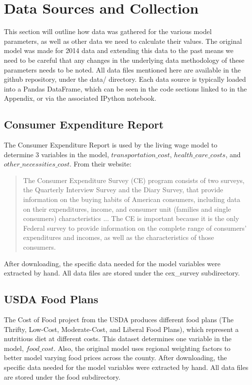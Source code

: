 \chapter{Data Sources and Collection}\label{ch:data_collection}

This section will outline how data was gathered for the various model parameters, as well as other data we need to calculate their values. The original model was made for 2014 data and extending this data to the past means we need to be careful that any changes in the underlying data methodology of these parameters needs to be noted. All data files mentioned here are available in the github repository, under the data/ directory. Each data source is typically loaded into a Pandas DataFrame, which can be seen in the code sections linked to in the Appendix, or via the associated IPython notebook. 

\section{Consumer Expenditure Report}

The Consumer Expenditure Report\cite{cex_survey} is used by the living wage model to determine 3 variables in the model, $transportation\_cost$, $health\_care\_costs$, and $other\_necessities\_cost$. From their website:

\begin{quote}
The Consumer Expenditure Survey (CE) program consists of two surveys, the Quarterly Interview Survey and the Diary Survey, that provide information on the buying habits of American consumers, including data on their expenditures, income, and consumer unit (families and single consumers) characteristics ... The CE is important because it is the only Federal survey to provide information on the complete range of consumers' expenditures and incomes, as well as the characteristics of those consumers.
\end{quote}

After downloading, the specific data needed for the model variables were extracted by hand. All data files are stored under the cex\_survey subdirectory. 

\section{USDA Food Plans}

The Cost of Food project from the USDA\cite{usda} produces different food plans (The Thrifty, Low-Cost, Moderate-Cost, and Liberal Food Plans), which represent a nutritious diet at different costs. This dataset determines one variable in the model, $food\_cost$. Also, the original model uses regional weighting factors to better model varying food prices across the county. \cite{usda_regional} After downloading, the specific data needed for the model variables were extracted by hand. All data files are stored under the food subdirectory. 

